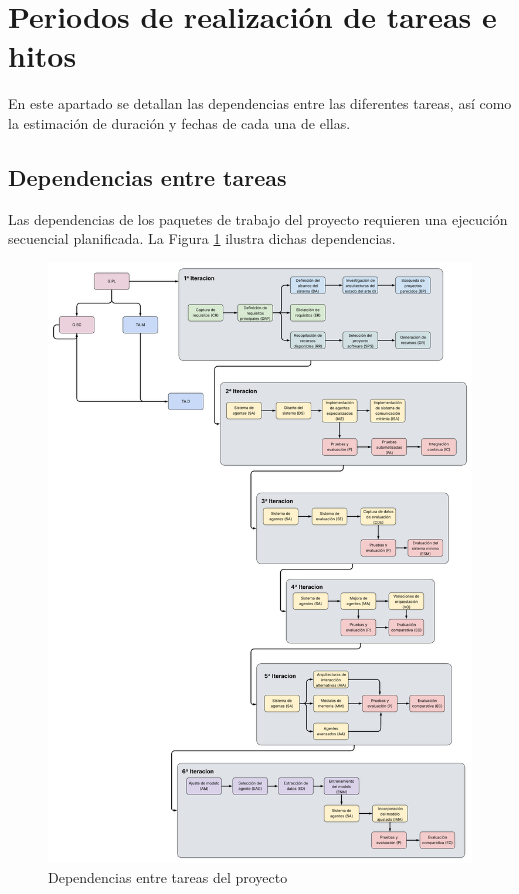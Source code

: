 \section{Periodos de realización de tareas e hitos}
En este apartado se detallan las dependencias entre las diferentes tareas, así como la estimación de duración y fechas de cada una de ellas.

\subsection{Dependencias entre tareas}
Las dependencias de los paquetes de trabajo del proyecto requieren una ejecución secuencial planificada. La Figura \ref{fig:dependencias} ilustra dichas dependencias.


\begin{figure}[h]
  \centering
  \includegraphics[scale=0.165]{figures/dependencias_2.png}%
  \caption{Dependencias entre tareas del proyecto}
  \label{fig:dependencias}
\end{figure}

